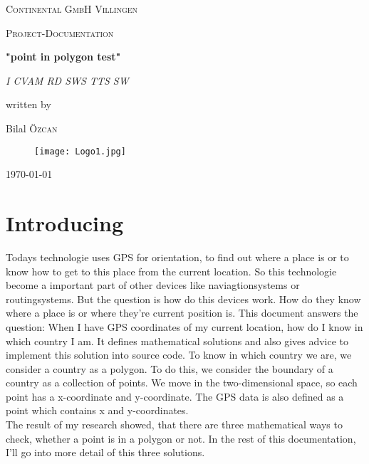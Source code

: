 \documentclass[12pt,a4paper]{scrreprt}
\begin{document}
\begin{titlepage}

	\centering
	{\scshape\LARGE Continental GmbH Villingen \par}
	\vspace{2cm}
	{\scshape\Large Project-Documentation\par}
	\vspace{1.5cm}
	{\huge\bfseries "point in polygon test"\par}
	\vspace{2cm}
	{\Large\itshape I CVAM RD SWS TTS SW \par}
	\vfill
	written by\par
	Bilal \textsc{Özcan}

	\vfill
	\begin{figure}
	\centering
	\texttt{[image: Logo1.jpg]}
	\vspace{1cm}
	\end{figure}

	{\large \today\par}
	\end{titlepage}

	\newpage
	
\chapter*{Introducing}
\begin{flushleft}
Todays technologie uses GPS for orientation, to find out where a place is or to know how to get to this place from the current location. So this technologie become a important part of other devices like naviagtionsystems or routingsystems. But the question is how do this devices work. How do they know where a place is or where they're current position is. This document answers the question: When I have GPS coordinates of my current location, how do I know in which country I am. It defines mathematical solutions and also gives advice to implement this solution into source code. To know in which country we are, we consider a country as a polygon. To do this, we consider the boundary of a country as a collection of points. We move in the two-dimensional space, so each point has a x-coordinate and y-coordinate. The GPS data is also defined as a point which contains x and y-coordinates.\\
\vspace{0.5cm}
The result of my research showed, that there are three mathematical ways to check, whether a point is in a polygon or not. In the rest of this documentation, I'll go into more detail of this three solutions.



\end{flushleft}
\end{document}
